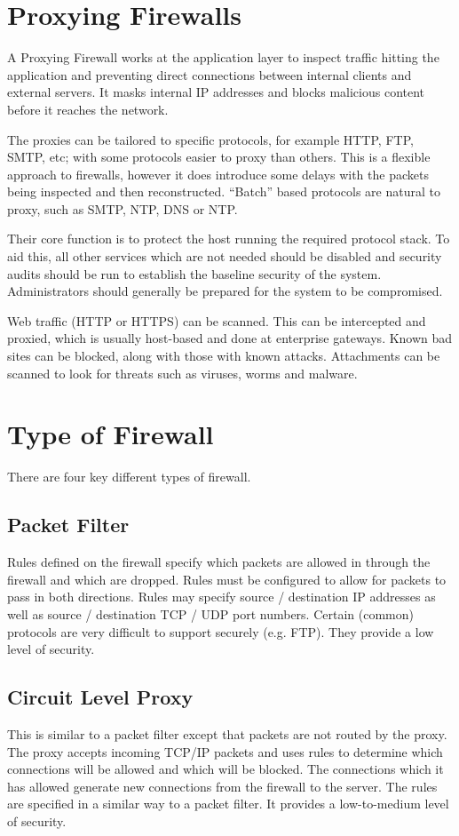 \section{Proxying Firewalls}
A Proxying Firewall works at the application layer to inspect traffic hitting the application and preventing direct connections between internal clients and external servers. It masks internal IP addresses and blocks malicious content before it reaches the network. 

The proxies can be tailored to specific protocols, for example HTTP, FTP, SMTP, etc; with some protocols easier to proxy than others. This is a flexible approach to firewalls, however it does introduce some delays with the packets being inspected and then reconstructed. ``Batch'' based protocols are natural to proxy, such as SMTP, NTP, DNS or NTP. 

Their core function is to protect the host running the required protocol stack. To aid this, all other services which are not needed should be disabled and security audits should be run to establish the baseline security of the system. Administrators should generally be prepared for the system to be compromised. 

Web traffic (HTTP or HTTPS) can be scanned. This can be intercepted and proxied, which is usually host-based and done at enterprise gateways. Known bad sites can be blocked, along with those with known attacks. Attachments can be scanned to look for threats such as viruses, worms and malware. 

\section{Type of Firewall}
There are four key different types of firewall.

\subsection{Packet Filter}
Rules defined on the firewall specify which packets are allowed in through the firewall and which are dropped. Rules must be configured to allow for packets to pass in both directions. Rules may specify source / destination IP addresses as well as source / destination TCP / UDP port numbers. Certain (common) protocols are very difficult to support securely (e.g. FTP). They provide a low level of security.

\subsection{Circuit Level Proxy}
This is similar to a packet filter except that packets are not routed by the proxy. The proxy accepts incoming TCP/IP packets and uses rules to determine which connections will be allowed and which will be blocked. The connections which it has allowed generate new connections from the firewall to the server. The rules are specified in a similar way to a packet filter. It provides a low-to-medium level of security. 

